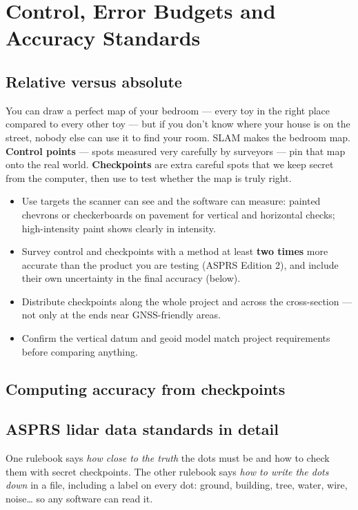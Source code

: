 \chapter{Control, Error Budgets and Accuracy Standards}

\section{Relative versus absolute}

\begin{kid}
You can draw a perfect map of your bedroom --- every toy in the right place compared to every other toy --- but if you don't know where your house is on the street, nobody else can use it to find your room. SLAM makes the bedroom map. \textbf{Control points} --- spots measured very carefully by surveyors --- pin that map onto the real world. \textbf{Checkpoints} are extra careful spots that we keep secret from the computer, then use to test whether the map is truly right.
\end{kid}


\begin{tip}
\begin{itemize}
\item Use targets the scanner can see and the software can measure: painted chevrons or checkerboards on pavement for vertical and horizontal checks; high-intensity paint shows clearly in intensity.
\item Survey control and checkpoints with a method at least \textbf{two times} more accurate than the product you are testing (ASPRS Edition 2), and include their own uncertainty in the final accuracy (below).
\item Distribute checkpoints along the whole project and across the cross-section --- not only at the ends near GNSS-friendly areas.
\item Confirm the vertical datum and geoid model match project requirements before comparing anything.
\end{itemize}
\end{tip}

\section{Computing accuracy from checkpoints}


\section{ASPRS lidar data standards in detail}

\begin{kid}
One rulebook says \emph{how close to the truth} the dots must be and how to check them with secret checkpoints. The other rulebook says \emph{how to write the dots down} in a file, including a label on every dot: ground, building, tree, water, wire, noise\ldots{} so any software can read it.
\end{kid}
